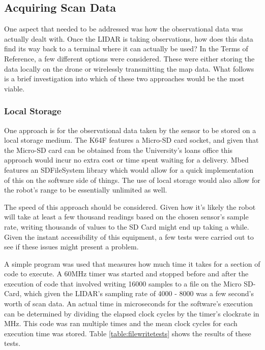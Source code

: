 				\subsection{Acquiring Scan Data}
				One aspect that needed to be addressed was how the observational data was actually dealt with. Once the LIDAR is taking observations, how does this data find its way back to a terminal where it can actually be used? In the Terms of Reference, a few different options were considered. These were either storing the data locally on the drone or wirelessly transmitting the map data. What follows is a brief investigation into which of these two approaches would be the most viable.
					
					\subsubsection{Local Storage}
					One approach is for the observational data taken by the sensor to be stored on a local storage medium. The K64F features a Micro-SD card socket, and given that the Micro-SD card can be obtained from the University's loans office this approach would incur no extra cost or time spent waiting for a delivery. Mbed features an SDFileSystem library\citep{sdfilesystemlibrary} which would allow for a quick implementation of this on the software side of things. The use of local storage would also allow for the robot's range to be essentially unlimited as well. 
					
					The speed of this approach should be considered. Given how it's likely the robot will take at least a few thousand readings based on the chosen sensor's sample rate, writing thousands of values to the SD Card might end up taking a while. Given the instant accessibility of this equipment, a few tests were carried out to see if these issues might present a problem. 
					
					A simple program was used that measures how much time it takes for a section of code to execute. A 60MHz timer was started and stopped before and after the execution of code that involved writing 16000 samples to a file on the Micro SD-Card, which given the LIDAR's sampling rate of 4000 - 8000 was a few second's worth of scan data. An actual time in microseconds for the software's execution can be determined by dividing the elapsed clock cycles by the timer's clockrate in MHz. This code was ran multiple times and the mean clock cycles for each execution time was stored. Table \ref{table:filewritetests} shows the results of these tests.

